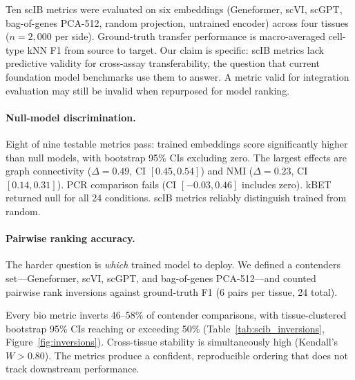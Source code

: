 \documentclass[11pt]{article}
\begin{document}
Ten scIB metrics were evaluated on six embeddings (Geneformer, scVI, scGPT, bag-of-genes PCA-512, random projection, untrained encoder) across four tissues ($n = 2{,}000$ per side). Ground-truth transfer performance is macro-averaged cell-type kNN F1 from source to target. Our claim is specific: scIB metrics lack predictive validity for cross-assay transferability, the question that current foundation model benchmarks use them to answer. A metric valid for integration evaluation may still be invalid when repurposed for model ranking.

\paragraph{Null-model discrimination.} Eight of nine testable metrics pass: trained embeddings score significantly higher than null models, with bootstrap 95\% CIs excluding zero. The largest effects are graph connectivity ($\Delta = 0.49$, CI $[0.45, 0.54]$) and NMI ($\Delta = 0.23$, CI $[0.14, 0.31]$). PCR comparison fails (CI $[-0.03, 0.46]$ includes zero). kBET returned null for all 24 conditions. scIB metrics reliably distinguish trained from random.

\paragraph{Pairwise ranking accuracy.} The harder question is \emph{which} trained model to deploy. We defined a contenders set---Geneformer, scVI, scGPT, and bag-of-genes PCA-512---and counted pairwise rank inversions against ground-truth F1 (6 pairs per tissue, 24 total).

Every bio metric inverts 46--58\% of contender comparisons, with tissue-clustered bootstrap 95\% CIs reaching or exceeding 50\% (Table~\ref{tab:scib_inversions}, Figure~\ref{fig:inversions}). Cross-tissue stability is simultaneously high (Kendall's $W > 0.80$). The metrics produce a confident, reproducible ordering that does not track downstream performance.
\end{document}
